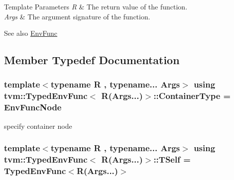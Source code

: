 \label{classtvm_1_1TypedEnvFunc_3_01R_07Args_8_8_8_08_4_TypedEnvFuncAnchor}%
\hypertarget{classtvm_1_1TypedEnvFunc_3_01R_07Args_8_8_8_08_4_TypedEnvFuncAnchor}{}%

\begin{DoxyTemplParams}{Template Parameters}
{\em R} & The return value of the function. \\
\hline
{\em Args} & The argument signature of the function. \\
\hline
\end{DoxyTemplParams}
\begin{DoxySeeAlso}{See also}
\hyperlink{classtvm_1_1EnvFunc}{Env\+Func} 
\end{DoxySeeAlso}


\subsection{Member Typedef Documentation}
\subsubsection[{\texorpdfstring{Container\+Type}{ContainerType}}]{\setlength{\rightskip}{0pt plus 5cm}template$<$typename R , typename... Args$>$ using {\bf tvm\+::\+Typed\+Env\+Func}$<$ R(Args...)$>$\+::{\bf Container\+Type} =  {\bf Env\+Func\+Node}}\hypertarget{classtvm_1_1TypedEnvFunc_3_01R_07Args_8_8_8_08_4_a5ab2d64bd5e6a0d5dbce945a0d5f8b30}{}\label{classtvm_1_1TypedEnvFunc_3_01R_07Args_8_8_8_08_4_a5ab2d64bd5e6a0d5dbce945a0d5f8b30}


specify container node 

\subsubsection[{\texorpdfstring{T\+Self}{TSelf}}]{\setlength{\rightskip}{0pt plus 5cm}template$<$typename R , typename... Args$>$ using {\bf tvm\+::\+Typed\+Env\+Func}$<$ R(Args...)$>$\+::{\bf T\+Self} =  {\bf Typed\+Env\+Func}$<$R(Args...)$>$}\hypertarget{classtvm_1_1TypedEnvFunc_3_01R_07Args_8_8_8_08_4_a29adf4db79c99318db779a71f26acc0f}{}\label{classtvm_1_1TypedEnvFunc_3_01R_07Args_8_8_8_08_4_a29adf4db79c99318db779a71f26acc0f}



